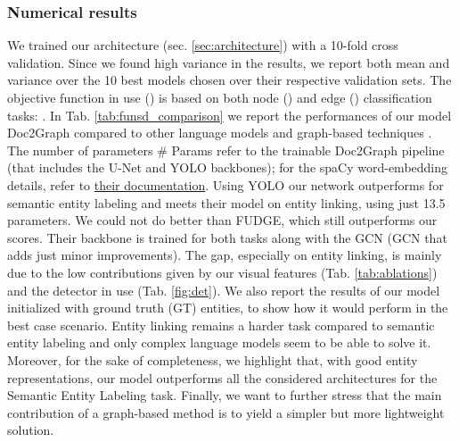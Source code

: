 \documentclass[runningheads]{llncs}
\begin{document}
\subsubsection{Numerical results}
We trained our architecture (sec. \ref{sec:architecture}) with a 10-fold cross validation. Since we found high variance in the results, we report both mean and variance over the 10 best models chosen over their respective validation sets. The objective function in use () is based on both node () and edge () classification tasks: .
In Tab. \ref{tab:funsd_comparison} we report the performances of our model Doc2Graph compared to other language models \cite{hong2020bros,xu2020layoutlm} and graph-based techniques \cite{carbonell2021named,davis2021visual}. The number of parameters \# Params refer to the trainable Doc2Graph pipeline (that includes the U-Net and YOLO backbones); for the spaCy word-embedding details, refer to \href{https://spacy.io/models/en\#en_core_web_lg}{their documentation}. Using YOLO our network outperforms \cite{carbonell2021named} for semantic entity labeling and meets their model on entity linking, using just 13.5 parameters. We could not do better than FUDGE, which still outperforms our scores. Their backbone is trained for both tasks along with the GCN (GCN that adds just minor improvements). The gap, especially on entity linking, is mainly due to the low contributions given by our visual features (Tab. \ref{tab:ablations}) and the detector in use (Tab. \ref{fig:det}).
We also report the results of our model initialized with ground truth (GT) entities, to show how it would perform in the best case scenario. Entity linking remains a harder task compared to semantic entity labeling and only complex language models seem to be able to solve it. Moreover, for the sake of completeness, we highlight that, with good entity representations, our model outperforms all the considered architectures for the Semantic Entity Labeling task. Finally, we want to further stress that the main contribution of a graph-based method is to yield a simpler but more lightweight solution.
\end{document}

